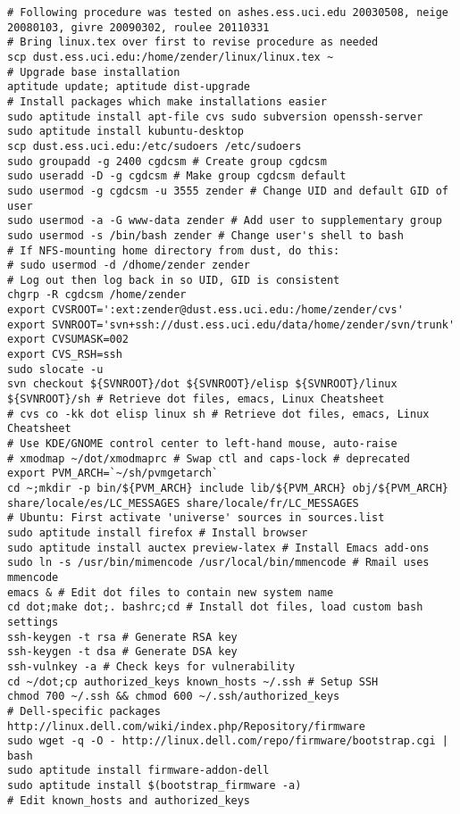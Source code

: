 \documentclass[12pt,twoside]{article}
\begin{document}
\begin{verbatim}
# Following procedure was tested on ashes.ess.uci.edu 20030508, neige 20080103, givre 20090302, roulee 20110331
# Bring linux.tex over first to revise procedure as needed
scp dust.ess.uci.edu:/home/zender/linux/linux.tex ~
# Upgrade base installation
aptitude update; aptitude dist-upgrade 
# Install packages which make installations easier
sudo aptitude install apt-file cvs sudo subversion openssh-server
sudo aptitude install kubuntu-desktop
scp dust.ess.uci.edu:/etc/sudoers /etc/sudoers
sudo groupadd -g 2400 cgdcsm # Create group cgdcsm
sudo useradd -D -g cgdcsm # Make group cgdcsm default
sudo usermod -g cgdcsm -u 3555 zender # Change UID and default GID of user
sudo usermod -a -G www-data zender # Add user to supplementary group
sudo usermod -s /bin/bash zender # Change user's shell to bash
# If NFS-mounting home directory from dust, do this:
# sudo usermod -d /dhome/zender zender 
# Log out then log back in so UID, GID is consistent
chgrp -R cgdcsm /home/zender
export CVSROOT=':ext:zender@dust.ess.uci.edu:/home/zender/cvs'
export SVNROOT='svn+ssh://dust.ess.uci.edu/data/home/zender/svn/trunk'
export CVSUMASK=002
export CVS_RSH=ssh
sudo slocate -u
svn checkout ${SVNROOT}/dot ${SVNROOT}/elisp ${SVNROOT}/linux ${SVNROOT}/sh # Retrieve dot files, emacs, Linux Cheatsheet
# cvs co -kk dot elisp linux sh # Retrieve dot files, emacs, Linux Cheatsheet
# Use KDE/GNOME control center to left-hand mouse, auto-raise 
# xmodmap ~/dot/xmodmaprc # Swap ctl and caps-lock # deprecated
export PVM_ARCH=`~/sh/pvmgetarch`
cd ~;mkdir -p bin/${PVM_ARCH} include lib/${PVM_ARCH} obj/${PVM_ARCH} share/locale/es/LC_MESSAGES share/locale/fr/LC_MESSAGES
# Ubuntu: First activate 'universe' sources in sources.list
sudo aptitude install firefox # Install browser
sudo aptitude install auctex preview-latex # Install Emacs add-ons
sudo ln -s /usr/bin/mimencode /usr/local/bin/mmencode # Rmail uses mmencode
emacs & # Edit dot files to contain new system name
cd dot;make dot;. bashrc;cd # Install dot files, load custom bash settings
ssh-keygen -t rsa # Generate RSA key
ssh-keygen -t dsa # Generate DSA key
ssh-vulnkey -a # Check keys for vulnerability
cd ~/dot;cp authorized_keys known_hosts ~/.ssh # Setup SSH
chmod 700 ~/.ssh && chmod 600 ~/.ssh/authorized_keys
# Dell-specific packages http://linux.dell.com/wiki/index.php/Repository/firmware
sudo wget -q -O - http://linux.dell.com/repo/firmware/bootstrap.cgi | bash
sudo aptitude install firmware-addon-dell
sudo aptitude install $(bootstrap_firmware -a)
# Edit known_hosts and authorized_keys

\end{verbatim}
\end{document}
